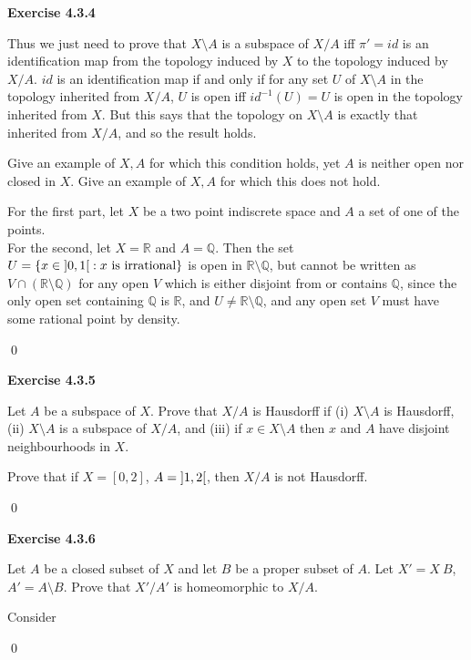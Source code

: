 \documentclass[12pt]{article}
\newcommand{\qcolor}{Gray}
\newcommand{\acolor}{Black}
\newcommand{\Q}{\mathbb{Q}}
\newcommand{\R}{\mathbb{R}}
\newcommand{\question}[1]{
	\color{\qcolor} 
	\item[#1~]}
\newcommand{\answer}[0]{
	\color{\acolor} 
	\item[]}
\newenvironment{exercise}[1]
{
	{
		\Large
		\color{\acolor}
		\addtolength\leftskip{-2em}
		\textbf{Exercise #1}
		
	}
	\begin{list}{}
	{
		\setlength\leftmargin{1em}
		\setlength\rightmargin{0em}
		\setlength\labelwidth{2em}
		\setlength\itemsep{0em}
		\setlength\parsep{0.5em}
		\setlength\baselineskip{1.25em}
	}
}
{
  \qed{}
  \end{list}
}
\begin{document}
\begin{exercise}{4.3.4}
  Thus we just need to prove that $X \setminus A$ is a subspace of $X/A$ iff $\pi' = id$ is an identification map from the topology induced by $X$ to the topology induced by $X/A$. $id$ is an identification map if and only if for any set $U$ of $X \setminus A$ in the topology inherited from $X/A$, $U$ is open iff $id^{-1}(U) = U$ is open in the topology inherited from $X$. But this says that the topology on $X\setminus A$ is exactly that inherited from $X/A$, and so the result holds.
  \question{} Give an example of $X, A$ for which this condition holds, yet $A$ is neither open nor closed in $X$. Give an example of $X, A$ for which this does not hold.
  \answer
  For the first part, let $X$ be a two point indiscrete space and $A$ a set of one of the points.\\
  For the second, let $X = \R$ and $A = \Q$. Then the set $U = \{ x \in \interval[open]{0}{1} : x \text{ is irrational} \}$ is open in $\R\setminus \Q$, but cannot be written as $V \cap (\R\setminus \Q)$ for any open $V$ which is either disjoint from or contains $\Q$, since the only open set containing $\Q$ is $\R$, and $U \neq \R \setminus \Q$, and any open set $V$ must have some rational point by density.
\end{exercise}

\begin{exercise}{4.3.5}
  \question{} Let $A$ be a subspace of $X$. Prove that $X/A$ is Hausdorff if (i) $X \setminus A$ is Hausdorff, (ii) $X \setminus A$ is a subspace of $X/A$, and (iii) if $x \in X \setminus A$ then $x$ and $A$ have disjoint neighbourhoods in $X$.
  \answer
  
  \question{} Prove that if $X = [0, 2]$, $A = \interval[open]{1}{2}$, then $X/A$ is not Hausdorff.
  \answer
  
\end{exercise}

\begin{exercise}{4.3.6}
  \question{} Let $A$ be a closed subset of $X$ and let $B$ be a proper subset of $A$. Let $X' = X \ B$, $A' = A \setminus B$. Prove that $X'/A'$ is homeomorphic to $X/A$.
  \answer
  Consider 
\end{exercise}
\end{document}
